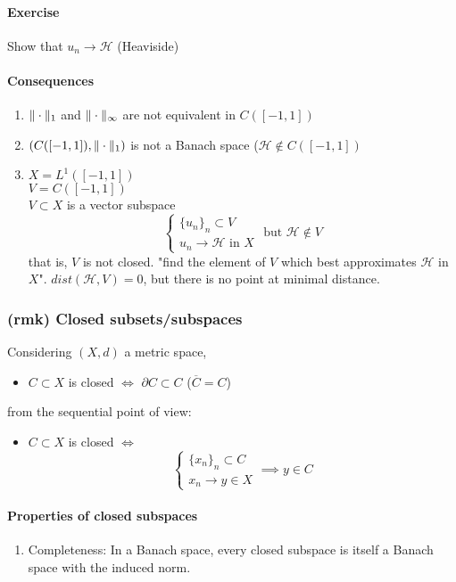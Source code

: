 \paragraph{Exercise}
Show that $u_n\to \mathcal H$ (Heaviside)
\paragraph{Consequences}
\begin{enumerate}
    \item $\Vert \cdot \Vert_1$ and $\Vert \cdot \Vert_\infty$ are not equivalent in $C([-1,1])$
    \item $(C([-1,1]),\Vert \cdot \Vert_1)$ is not a Banach space ($\mathcal H\notin C([-1,1])$
    \item $X=L^1([-1,1])$\\ $V=C([-1,1])$\\$V\subset X$ is a vector subspace
    $$\begin{cases}
        \{u_n\}_n\subset V\\ u_n\to \mathcal H \text{ in } X
    \end{cases} \text{ but }\mathcal H\notin V$$
    that is, $V$ is not closed.
    "find the element of $V$ which best approximates $\mathcal H$ in $X$". $dist(\mathcal H,V)=0$, but there is no point at minimal distance.
\end{enumerate}
\subsubsection{(rmk) Closed subsets/subspaces}
Considering $(X,d)$ a metric space,
\begin{itemize}
    \item $C\subset X$ is closed $\iff$ $\partial C\subset C$ ($\overline C=C$)
\end{itemize}
    from the sequential point of view:
    \begin{itemize}
        \item $C\subset X$ is closed $\iff$
    $$\begin{cases}
        \{ x_n\}_n\subset C\\ x_n\to y\in X
    \end{cases}\implies y\in C$$
    \end{itemize}
    
\paragraph{Properties of closed subspaces}
\begin{enumerate}
    \item Completeness: In a Banach space, every closed subspace is itself a Banach space with the induced norm.
\end{enumerate}